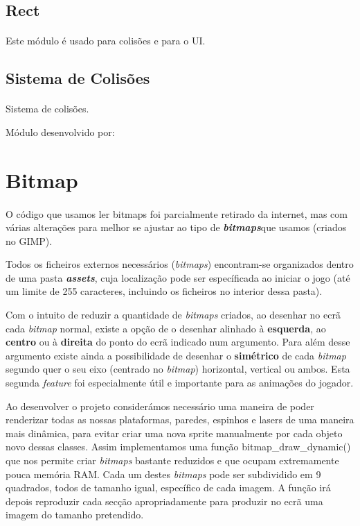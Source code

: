\documentclass{report}
\begin{document}
\subsection{Rect}

\paragraph{}
Este módulo é usado para colisões e para o UI. 

\subsection{Sistema de Colisões}

\paragraph{}
Sistema de colisões. \newline

Módulo desenvolvido por: 

\section{Bitmap}

\paragraph{}
O código que usamos ler bitmaps foi parcialmente retirado da internet, mas com várias alterações para melhor se ajustar ao tipo de \textbf{\textit{bitmaps}}que usamos (criados no GIMP).

Todos os ficheiros externos necessários (\textit{bitmaps}) encontram-se organizados dentro de uma pasta \textbf{\textit{assets}}, cuja localização pode ser específicada ao iniciar o jogo (até um limite de 255 caracteres, incluindo os ficheiros no interior dessa pasta).

Com o intuito de reduzir a quantidade de \textit{bitmaps} criados, ao desenhar no ecrã cada \textit{bitmap} normal, existe a opção de o desenhar alinhado à \textbf{esquerda}, ao \textbf{centro} ou à \textbf{direita} do ponto do ecrã indicado num argumento. Para além desse argumento existe ainda a possibilidade de desenhar o \textbf{simétrico} de cada \textit{bitmap} segundo quer o seu eixo (centrado no \textit{bitmap}) horizontal, vertical ou ambos. Esta segunda \textit{feature} foi especialmente útil e importante para as animações do jogador. 

Ao desenvolver o projeto considerámos necessário uma maneira de poder renderizar todas as nossas plataformas, paredes, espinhos e lasers de uma maneira mais dinâmica, para evitar criar uma nova sprite manualmente por cada objeto novo dessas classes. Assim implementamos uma função bitmap\_draw\_dynamic() que nos permite criar \textit{bitmaps} bastante reduzidos e que ocupam extremamente pouca memória RAM. Cada um destes \textit{bitmaps} pode ser subdividido em 9 quadrados, todos de tamanho igual, específico de cada imagem. A função irá depois reproduzir cada secção apropriadamente para produzir no ecrã uma imagem do tamanho pretendido.
\end{document}
